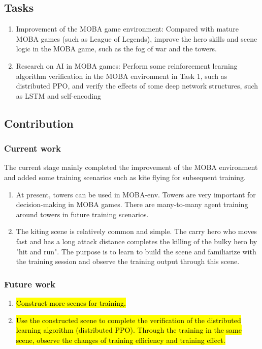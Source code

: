 \documentclass[runningheads]{llncs}
\begin{document}
\subsection{Tasks}
\begin{enumerate}
\item Improvement of the MOBA game environment: Compared with mature MOBA games (such as League of Legends), improve the hero skills and scene logic in the MOBA game, such as the fog of war and the towers.\\

\item Research on AI in MOBA games: Perform some reinforcement learning algorithm verification in the MOBA environment in Task 1, such as distributed PPO, and verify the effects of some deep network structures, such as LSTM and self-encoding
\end{enumerate}
\subsection{Contribution}
\subsubsection{Current work}
The current stage mainly completed the improvement of the MOBA environment  and added some training scenarios such as kite flying for subsequent training.\\
\begin{enumerate}
\item At present, towers can be used in MOBA-env. Towers are very important for decision-making in MOBA games. There are many-to-many agent training around towers in future training scenarios.\\
\item The kiting scene is relatively common and simple. The carry hero who moves fast and has a long attack distance completes the killing of the bulky hero by "hit and run". The purpose is to learn to build the scene and familiarize with the training session and observe the training output through this scene.
\end{enumerate}
\subsubsection{Future work}
\begin{enumerate}
\item {\hl {Construct more scenes for training.\\}}
\item{\hl {Use the constructed scene to complete the verification of the distributed learning algorithm (distributed PPO). Through the training in the same scene, observe the changes of training efficiency and training effect.}}
\end{enumerate}
\end{document}
